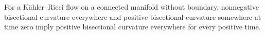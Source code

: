 \begin{remark}
\label{rem:kahler-ricci-positive-bisectional-curvature}
For a K\"ahler--Ricci flow on a connected manifold without boundary,
nonnegative bisectional curvature everywhere and positive bisectional
curvature somewhere at time zero imply positive bisectional curvature
everywhere for every positive time.
\end{remark}
